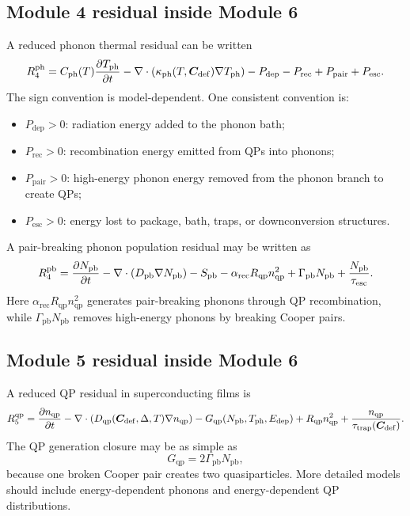 \documentclass[11pt]{article}
\newcommand{\Edep}{E_{\mathrm{dep}}}
\newcommand{\Cvec}{\bm{C}_{\mathrm{def}}}
\newcommand{\Tph}{T_{\mathrm{ph}}}
\newcommand{\Cph}{C_{\mathrm{ph}}}
\newcommand{\kappaph}{\kappa_{\mathrm{ph}}}
\newcommand{\Npb}{N_{\mathrm{pb}}}
\newcommand{\DeltaSC}{\Delta}
\newcommand{\nqp}{n_{\mathrm{qp}}}
\newcommand{\Dqp}{D_{\mathrm{qp}}}
\newcommand{\Gqp}{G_{\mathrm{qp}}}
\newcommand{\Rqp}{R_{\mathrm{qp}}}
\newcommand{\tautrap}{\tau_{\mathrm{trap}}}
\newcommand{\Gammapb}{\Gamma_{\mathrm{pb}}}
\begin{document}
\subsection{Module 4 residual inside Module 6}

A reduced phonon thermal residual can be written
\begin{equation}
R_4^{\mathrm{ph}}
=\Cph(T)\pdv{\Tph}{t}
-\nabla\cdot(\kappaph(T,\Cvec)\nabla\Tph)
-P_{\mathrm{dep}}
-P_{\mathrm{rec}}
+P_{\mathrm{pair}}
+P_{\mathrm{esc}}.
\end{equation}
The sign convention is model-dependent. One consistent convention is:
\begin{itemize}[leftmargin=2em]
\item \(P_{\mathrm{dep}}>0\): radiation energy added to the phonon bath;
\item \(P_{\mathrm{rec}}>0\): recombination energy emitted from QPs into phonons;
\item \(P_{\mathrm{pair}}>0\): high-energy phonon energy removed from the phonon branch to create QPs;
\item \(P_{\mathrm{esc}}>0\): energy lost to package, bath, traps, or downconversion structures.
\end{itemize}
A pair-breaking phonon population residual may be written as
\begin{equation}
R_4^{\mathrm{pb}}
=\pdv{\Npb}{t}
-\nabla\cdot(D_{\mathrm{pb}}\nabla\Npb)
-S_{\mathrm{pb}}
-\alpha_{\mathrm{rec}}\Rqp\nqp^2
+\Gammapb\Npb
+\frac{\Npb}{\tau_{\mathrm{esc}}}.
\end{equation}
Here \(\alpha_{\mathrm{rec}}\Rqp\nqp^2\) generates pair-breaking phonons through QP recombination, while \(\Gammapb\Npb\) removes high-energy phonons by breaking Cooper pairs.

\subsection{Module 5 residual inside Module 6}

A reduced QP residual in superconducting films is
\begin{equation}
R_5^{\mathrm{qp}}
=\pdv{\nqp}{t}
-\nabla\cdot(\Dqp(\Cvec,\DeltaSC,T)\nabla\nqp)
-\Gqp(\Npb,\Tph,\Edep)
+\Rqp\nqp^2
+\frac{\nqp}{\tautrap(\Cvec)}.
\end{equation}
The QP generation closure may be as simple as
\begin{equation}
\Gqp=2\Gammapb\Npb,
\end{equation}
because one broken Cooper pair creates two quasiparticles. More detailed models should include energy-dependent phonons and energy-dependent QP distributions.
\end{document}
